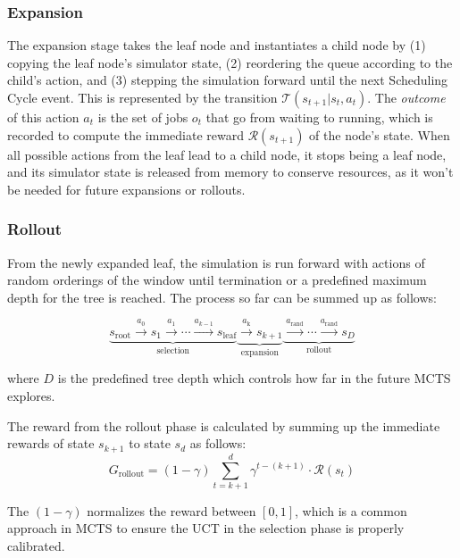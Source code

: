 \documentclass[conference]{IEEEtran}
\begin{document}
\subsubsection{Expansion}
\label{sec:expansion}
The expansion stage takes the leaf node and instantiates a child node by 
(1) copying the leaf node's simulator state, (2) reordering the queue according to the child's action, and (3) stepping the simulation forward until the next Scheduling Cycle event. This is represented by the transition $\mathcal{T}(s_{t+1} | s_t, a_{t})$. The \emph{outcome} of this action $a_{t}$ is the set of jobs $o_{t}$ that go from waiting to running, which is recorded to compute the immediate reward $\mathcal{R}(s_{t+1})$ of the node's state. When all possible actions from the leaf lead to a child node, it stops being a leaf node, and its simulator state is released from memory to conserve resources, as it won't be needed for future expansions or rollouts.

\subsubsection{Rollout}
\label{sec:rollout}
From the newly expanded leaf, the simulation is run forward with actions of random orderings of the window until termination or a predefined maximum depth for the tree is reached. The process so far can be summed up as follows:

\begin{equation}
\underbrace{s_{\text{root}} \xrightarrow{a_0} s_1 \xrightarrow{a_1} \cdots \xrightarrow{a_{k-1}} s_{\text{leaf}}}_{\text{selection}} \underbrace{\xrightarrow{a_{\text{k}}} s_{k+1}}_{\text{expansion}} \underbrace{\xrightarrow{a_{\text{rand}}} \cdots \xrightarrow{a_{\text{rand}}} s_{D}}_{\text{rollout}}
\end{equation}

where $D$ is the predefined tree depth which controls how far in the future MCTS explores.

The reward from the rollout phase is calculated by summing up the immediate rewards of state $s_{k+1}$ to state $s_{d}$ as follows:
\begin{equation}
    G_{\text{rollout}} = (1 - \gamma)\sum_{t=k+1}^{d} \gamma^{t -(k+1)} \cdot \mathcal{R}(s_t)
\end{equation}

The $(1 - \gamma)$ normalizes the reward between $[0,1]$, which is a common approach in MCTS to ensure the UCT in the selection phase is properly calibrated.
\end{document}
